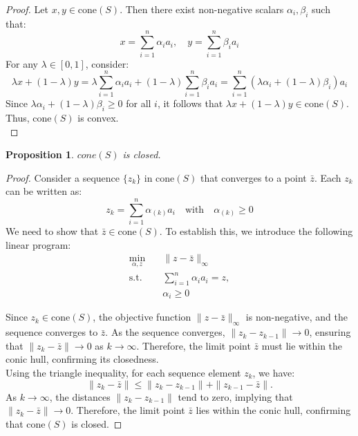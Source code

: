 \documentclass[11pt]{amsart} %
\newtheorem{prop}[thm]{Proposition}
\theoremstyle{definition}
\begin{document}
\begin{proof}
Let \( x, y \in \text{cone}(S) \). Then there exist non-negative scalars \( \alpha_i, \beta_i \) such that:
\[
x = \sum_{i=1}^n \alpha_i a_i, \quad y = \sum_{i=1}^n \beta_i a_i
\]
For any \( \lambda \in [0, 1] \), consider:
\[
\lambda x + (1 - \lambda) y = \lambda \sum_{i=1}^n \alpha_i a_i + (1 - \lambda) \sum_{i=1}^n \beta_i a_i = \sum_{i=1}^n (\lambda \alpha_i + (1 - \lambda) \beta_i) a_i
\]
Since \( \lambda \alpha_i + (1 - \lambda) \beta_i \geq 0 \) for all \( i \), it follows that \( \lambda x + (1 - \lambda) y \in \text{cone}(S) \). Thus, \(\text{cone}(S)\) is convex.\\
\end{proof}

\begin{prop}
    \({cone(S)}\) is closed.
\end{prop}
\begin{proof}
Consider a sequence \( \{z_k\} \) in \(\text{cone}(S)\) that converges to a point \( \bar{z} \). Each \( z_k \) can be written as:
\[
z_k = \sum_{i=1}^n \alpha_{(k)} a_i \quad \text{with} \quad \alpha_{(k)} \geq 0
\]
We need to show that \( \bar{z} \in \text{cone}(S) \). To establish this, we introduce the following linear program:
\[
\begin{aligned}
\min_{\alpha, z} & \quad \|z - \bar{z}\|_\infty \\
\text{s.t.} & \quad \sum_{i=1}^n \alpha_i a_i = z, \\
& \quad \alpha_i \geq 0
\end{aligned}
\]

Since \( z_k \in \text{cone}(S) \), the objective function \( \|z - \bar{z}\|_\infty \) is non-negative, and the sequence converges to \( \bar{z} \). As the sequence converges, \( \| z_k - z_{k-1} \| \to 0 \), ensuring that \( \| z_k - \bar{z} \| \to 0 \) as \( k \to \infty \). Therefore, the limit point \( \bar{z} \) must lie within the conic hull, confirming its closedness.\\

Using the triangle inequality, for each sequence element \( z_k \), we have:
\[
\| z_k - \bar{z} \| \leq \| z_k - z_{k-1} \| + \| z_{k-1} - \bar{z} \|.
\]
As \( k \to \infty \), the distances \( \| z_k - z_{k-1} \| \) tend to zero, implying that \( \| z_k - \bar{z} \| \to 0 \). Therefore, the limit point \( \bar{z} \) lies within the conic hull, confirming that \( \text{cone}(S) \) is closed.
\end{proof}
\end{document}
